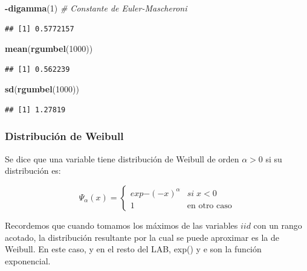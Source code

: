 \documentclass[
  oneside]{book}
\newenvironment{Shaded}{\begin{snugshade}}{\end{snugshade}}
\newcommand{\CommentTok}[1]{\textcolor[rgb]{0.56,0.35,0.01}{\textit{#1}}}
\newcommand{\DecValTok}[1]{\textcolor[rgb]{0.00,0.00,0.81}{#1}}
\newcommand{\FunctionTok}[1]{\textcolor[rgb]{0.13,0.29,0.53}{\textbf{#1}}}
\newcommand{\NormalTok}[1]{#1}
\newcommand{\SpecialCharTok}[1]{\textcolor[rgb]{0.81,0.36,0.00}{\textbf{#1}}}
\begin{document}
\begin{Shaded}
\begin{Highlighting}[]
\SpecialCharTok{{-}}\FunctionTok{digamma}\NormalTok{(}\DecValTok{1}\NormalTok{) }\CommentTok{\# Constante de Euler{-}Mascheroni}
\end{Highlighting}
\end{Shaded}

\begin{verbatim}
## [1] 0.5772157
\end{verbatim}

\begin{Shaded}
\begin{Highlighting}[]
\FunctionTok{mean}\NormalTok{(}\FunctionTok{rgumbel}\NormalTok{(}\DecValTok{1000}\NormalTok{))}
\end{Highlighting}
\end{Shaded}

\begin{verbatim}
## [1] 0.562239
\end{verbatim}

\begin{Shaded}
\begin{Highlighting}[]
\FunctionTok{sd}\NormalTok{(}\FunctionTok{rgumbel}\NormalTok{(}\DecValTok{1000}\NormalTok{))}
\end{Highlighting}
\end{Shaded}

\begin{verbatim}
## [1] 1.27819
\end{verbatim}

\hypertarget{distribuciuxf3n-de-weibull}{%
\subsubsection{Distribución de
Weibull}\label{distribuciuxf3n-de-weibull}}

Se dice que una variable tiene distribución de Weibull de orden
\(\alpha>0\) si su distribución es:

\begin{equation}
\Psi_{\alpha}(x)=\begin{cases}
exp{-(-x)^{\alpha}} & si\;x<0\\
1 & \text{en otro caso}
\end{cases}
\end{equation}

Recordemos que cuando tomamos los máximos de las variables \(iid\) con
un rango acotado, la distribución resultante por la cual se puede
aproximar es la de Weibull. En este caso, y en el resto del LAB, exp() y
e son la función exponencial.
\end{document}
